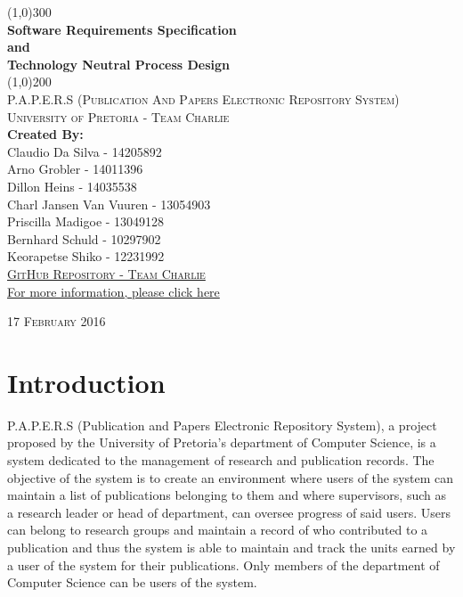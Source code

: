 \documentclass{article}
\begin{document}
	\begin{titlepage}
		\begin{center}
		
			\line(1,0){300}\\
			[6mm]
			\huge{
				\bfseries Software Requirements Specification\\
				and\\
				Technology Neutral Process Design
			}\\
			[2mm]
			\line(1,0){200}\\
			[15mm]
			\textsc{\large P.A.P.E.R.S (Publication And Papers Electronic Repository System)}\\
			[7.5mm]
			\textsc{\large University of Pretoria - Team Charlie}\\
			[20mm]
			\large{\textbf{Created By:}}\\
			[2mm]
			\large{
				Claudio Da Silva - 14205892\\
				Arno Grobler - 14011396\\
				Dillon Heins - 14035538\\
				Charl Jansen Van Vuuren - 13054903\\
				Priscilla Madigoe - 13049128\\
				Bernhard Schuld - 10297902\\
				Keorapetse Shiko - 12231992
			}\\
			[4cm]

		\href{https://github.com/DillonHeins/Charlie}{\textsc{\Large GitHub Repository - Team Charlie}\\[2mm]
		  For more information, please click here}
			
		\end{center}	
		\begin{flushright}
			\textsc{\large 17 February 2016}
		\end{flushright}
	\end{titlepage}
	
	\cleardoublepage
	\thispagestyle{empty}
	\tableofcontents
	\cleardoublepage
	\listoffigures
	\cleardoublepage
	\setcounter{page}{1}
	\section{Introduction}\label{sec:intro}
	P.A.P.E.R.S (Publication and Papers Electronic Repository System), a project proposed by the University of Pretoria's department of Computer Science, is a system dedicated to the management of research and publication records. The objective of the system is to create an environment where users of the system can maintain a list of publications belonging to them and where supervisors, such as a research leader or head of department, can oversee progress of said users. Users can belong to research groups and maintain a record of who contributed to a publication and thus the system is able to maintain and track the units earned by a user of the system for their publications. Only members of the department of Computer Science can be users of the system. 
	
\end{document}
